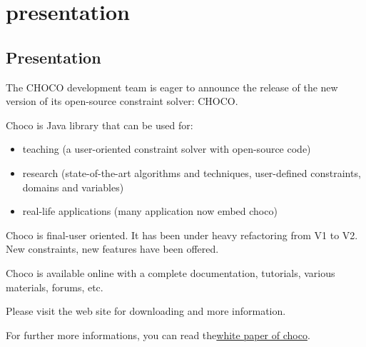 \part{presentation}\label{presentation}

\chapter{Presentation}\label{sec:Presentation}
The CHOCO development team is eager to announce the release of the new version of its open-source constraint solver: CHOCO.

Choco is Java library that can be used for:
\begin{itemize}
	\item teaching (a user-oriented constraint solver with open-source code)
	\item research (state-of-the-art algorithms and techniques, user-defined constraints, domains and variables)
	\item real-life applications (many application now embed choco)
\end{itemize}

Choco is final-user oriented. It has been under heavy refactoring from V1 to V2. New constraints, new features have been offered.

Choco is available online with a complete documentation, tutorials, various materials, forums, etc.

Please visit the web site for downloading and more information.


For further more informations, you can read the\href{media/pdf/choco-presentation.pdf}{white paper of choco}.
